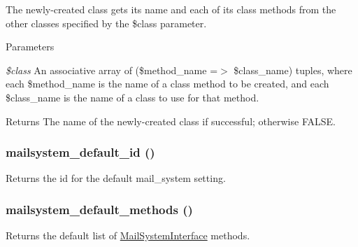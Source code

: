 The newly-\/created class gets its name and each of its class methods from the other classes specified by the \$class parameter.


\begin{DoxyParams}{Parameters}
\item[{\em \$class}]An associative array of (\$method\_\-name =$>$ \$class\_\-name) tuples, where each \$method\_\-name is the name of a class method to be created, and each \$class\_\-name is the name of a class to use for that method.\end{DoxyParams}
\begin{DoxyReturn}{Returns}
The name of the newly-\/created class if successful; otherwise FALSE. 
\end{DoxyReturn}
\hypertarget{mailsystem_8module_a6dc2bc890196d513049110b752b33cb5}{
\subsubsection[{mailsystem\_\-default\_\-id}]{\setlength{\rightskip}{0pt plus 5cm}mailsystem\_\-default\_\-id ()}}
\label{mailsystem_8module_a6dc2bc890196d513049110b752b33cb5}
Returns the id for the default mail\_\-system setting. \hypertarget{mailsystem_8module_a550d9fb0b029f862fbfdfc31670ca4da}{
\subsubsection[{mailsystem\_\-default\_\-methods}]{\setlength{\rightskip}{0pt plus 5cm}mailsystem\_\-default\_\-methods ()}}
\label{mailsystem_8module_a550d9fb0b029f862fbfdfc31670ca4da}
Returns the default list of \hyperlink{interfaceMailSystemInterface}{MailSystemInterface} methods.

